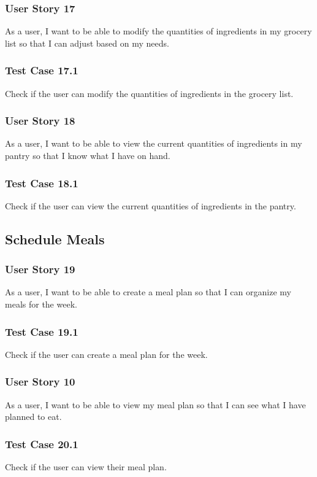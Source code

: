 \documentclass[11pt, letterpaper]{report}
\begin{document}
\subsubsection{User Story 17}
As a user, I want to be able to modify the quantities of ingredients in my grocery list so that I can adjust based on my needs.

\subsubsection{Test Case 17.1}
Check if the user can modify the quantities of ingredients in the grocery list.

\subsubsection{User Story 18}
As a user, I want to be able to view the current quantities of ingredients in my pantry so that I know what I have on hand.

\subsubsection{Test Case 18.1}
Check if the user can view the current quantities of ingredients in the pantry.

\subsection{Schedule Meals}

\subsubsection{User Story 19}
As a user, I want to be able to create a meal plan so that I can organize my meals for the week.

\subsubsection{Test Case 19.1}
Check if the user can create a meal plan for the week.

\subsubsection{User Story 10}
As a user, I want to be able to view my meal plan so that I can see what I have planned to eat.

\subsubsection{Test Case 20.1}
Check if the user can view their meal plan.
\end{document}

